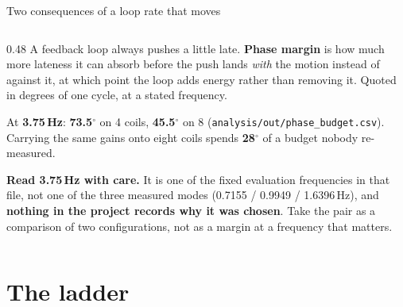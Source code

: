\documentclass[aspectratio=169]{beamer}
\begin{document}
\begin{frame}{Two consequences of a loop rate that moves}
\begin{columns}[T]
\begin{column}{0.48\textwidth}
      \vspace{1.5mm}
      A feedback loop always pushes a little late. \textbf{Phase margin} is how
      much more lateness it can absorb before the push lands \emph{with} the
      motion instead of against it, at which point the loop adds energy rather
      than removing it. Quoted in degrees of one cycle, at a stated frequency.

      \vspace{1.5mm}
      At \textbf{3.75\,Hz}: \textbf{73.5$^\circ$} on 4 coils,
      \textbf{45.5$^\circ$} on 8
      (\texttt{analysis/out/phase\_budget.csv}). Carrying the same gains onto
      eight coils spends \textbf{28$^\circ$} of a budget nobody re-measured.

      \vspace{1.5mm}
      {\scriptsize \textbf{Read 3.75\,Hz with care.} It is one of the fixed
      evaluation frequencies in that file, not one of the three measured modes
      (0.7155 / 0.9949 / 1.6396\,Hz), and \textbf{nothing in the project records
      why it was chosen}. Take the pair as a comparison of two configurations,
      not as a margin at a frequency that matters.}
    \end{column}
  \end{columns}
\end{frame}


\section{The ladder}
\end{document}
